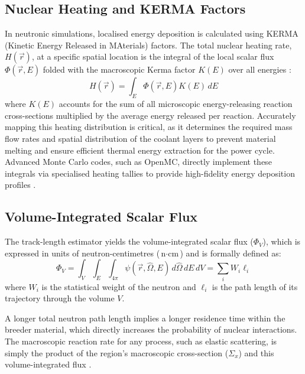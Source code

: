 \documentclass[11pt]{article}
\begin{document}
\begin{appendices}
\subsection{Nuclear Heating and KERMA Factors}
\label{app:theory_nuclear_heating}
In neutronic simulations, localised energy deposition is calculated using KERMA (Kinetic Energy
Released in MAterials) factors. The total nuclear heating rate, $H(\vec{r})$, at a specific spatial
location is the integral of the local scalar flux $\Phi(\vec{r}, E)$ folded with the macroscopic
Kerma factor $K(E)$ over all energies \citep{kuridan_neutron_2023}:
\begin{equation}
    H(\vec{r}) = \int_{E} \Phi(\vec{r}, E) K(E) \, dE
    \label{eq:nuclear_heating}
\end{equation}
where $K(E)$ accounts for the sum of all microscopic energy-releasing reaction cross-sections
multiplied by the average energy released per reaction. Accurately mapping this heating distribution
is critical, as it determines the required mass flow rates and spatial distribution of the coolant
layers to prevent material melting and ensure efficient thermal energy extraction for the power
cycle. Advanced Monte Carlo codes, such as OpenMC, directly implement these integrals via
specialised heating tallies to provide high-fidelity energy deposition profiles
\citep{romano_openmc_2015}.

\subsection{Volume-Integrated Scalar Flux}
\label{app:theory_track_length}
The track-length estimator yields the volume-integrated scalar flux ($\Phi_{V}$), which is expressed
in units of neutron-centimetres ($\text{n} \cdot \text{cm}$) \citep{kuridan_neutron_2023,
kalos_monte_2008} and is formally defined as:
\begin{equation}
\Phi_{V} = \int_{V} \int_{E} \int_{4\pi} \psi(\vec{r}, \hat{\Omega}, E) \, d\hat{\Omega} \, dE \, dV = \sum_{i} W_{i} \ell_{i}
\label{eq:track_length_estimator}
\end{equation}
where $W_{i}$ is the statistical weight of the neutron and $\ell_{i}$ is the path length of its
trajectory through the volume $V$.

A longer total neutron path length implies a longer residence time within the breeder material,
which directly increases the probability of nuclear interactions. The macroscopic reaction rate for
any process, such as elastic scattering, is simply the product of the region's macroscopic
cross-section ($\Sigma_{x}$) and this volume-integrated flux \citep{kuridan_neutron_2023,
kalos_monte_2008}.


\end{appendices}
\end{document}
